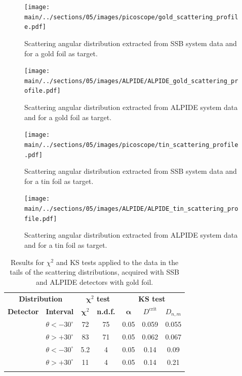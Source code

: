 \documentclass[../../main/main.tex]{subfiles}
\begin{document}
\begin{figure}[!h]
    \texttt{[image: \\main/../sections/05/images/picoscope/gold\_scattering\_profile.pdf]}
    \caption{Scattering angular distribution extracted from SSB system data and for a gold foil as target.}
    \label{fig:analysis_picoscope_scattering_gold}
\end{figure}

\begin{figure}[!h]
    \texttt{[image: \\main/../sections/05/images/ALPIDE/ALPIDE\_gold\_scattering\_profile.pdf]}
    \caption{Scattering angular distribution extracted from ALPIDE system data and for a gold foil as target.}
    \label{fig:analysis_ALPIDE_scattering_gold}
\end{figure}

\clearpage

\begin{figure}[!h]
    \texttt{[image: \\main/../sections/05/images/picoscope/tin\_scattering\_profile.pdf]}
    \caption{Scattering angular distribution extracted from SSB system data and for a tin foil as target.}
    \label{fig:analysis_picoscope_scattering_tin}
\end{figure}

\begin{figure}[!h]
    \texttt{[image: \\main/../sections/05/images/ALPIDE/ALPIDE\_tin\_scattering\_profile.pdf]}
    \caption{Scattering angular distribution extracted from ALPIDE system data and for a tin foil as target.}
    \label{fig:analysis_ALPIDE_scattering_tin}
\end{figure}

\clearpage


\begin{table}[h]
    \begin{tabular}{cl|cc|ccc}
        \toprule
        \multicolumn{2}{c|}{\textbf{Distribution}} &
        \multicolumn{2}{c|}{\textbf{$\boldsymbol{\chi}^2$ test}} &
        \multicolumn{3}{c}{\textbf{KS test}}\\
        \colrule
        \textbf{Detector} & \textbf{Interval} & $\boldsymbol{\chi}^2$ &
        \textbf{n.d.f.} & $\boldsymbol{\alpha}$ & $D^{\mathrm{crit}}$
        & $D_{n,m}$\\
        \colrule
        \multirow{2}{*}{ALPIDE} & $\theta < -30^{\circ}$ & 72 & 75 & 0.05 & 0.059  & 0.055 \\
                                & $\theta > +30^{\circ}$ & 83 & 71 & 0.05 & 0.062  & 0.067 \\
        \colrule
        \multirow{2}{*}{SSB} & $\theta < -30^{\circ} $   & 5.2 & 4 & 0.05 &  0.14  & 0.09 \\
                             & $\theta > +30^{\circ} $   & 11 & 4 & 0.05 & 0.14 & 0.21 \\
        \botrule
    \end{tabular}
    \caption{Results for \( \chi^{2} \) and KS tests applied to the data in the tails of the scattering distributions, acquired with SSB and ALPIDE detectors with gold foil.}
    \label{tab:stats}
\end{table}
\end{document}
